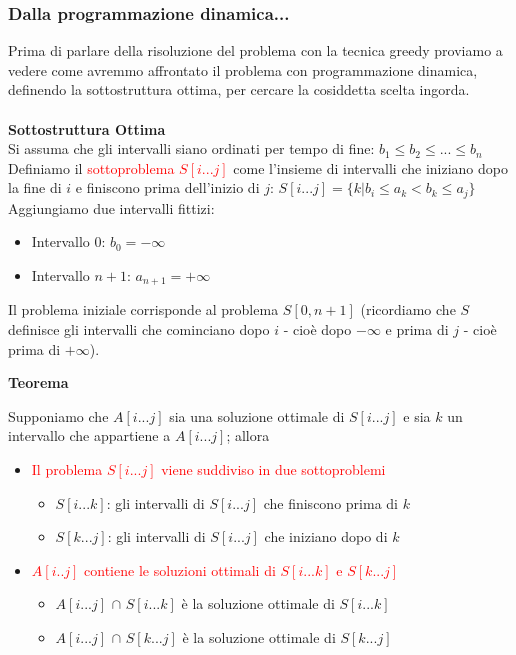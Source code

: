 \documentclass[../cheatSheetAlgoritmi.tex]{subfiles}
\begin{document}
\subsubsection{Dalla programmazione dinamica...}
Prima di parlare della risoluzione del problema con la tecnica greedy proviamo a vedere come avremmo affrontato il problema con programmazione dinamica, definendo la sottostruttura ottima, per cercare la cosiddetta scelta ingorda.\\\\
\textbf{Sottostruttura Ottima}\\
Si assuma che gli intervalli siano ordinati per tempo di fine: $b_1 \leq b_2 \leq ... \leq b_n$\\
Definiamo il \textcolor{red}{sottoproblema $S[i...j]$} come l'insieme di intervalli che iniziano dopo la fine di $i$ e finiscono prima dell'inizio di $j$: $S[i...j] = \{k|b_i \leq a_k < b_k \leq a_j\}$\\
Aggiungiamo due intervalli fittizi:\\
\begin{itemize}
	\item  Intervallo 0: $b_0 = - \infty$ 
	\item  Intervallo $n+1$: $a_{n+1} = + \infty$ 
\end{itemize}
Il problema iniziale corrisponde al problema $S[0,n+1]$ (ricordiamo che $S$ definisce gli intervalli che cominciano dopo $i$ - cioè dopo $- \infty$ e prima di $j$ - cioè prima di $+ \infty$).
\newpage
\begin{flushleft}
\textbf{Teorema}
\end{flushleft}
Supponiamo che $A[i...j]$ sia una soluzione ottimale di $S[i...j]$ e sia $k$ un intervallo che appartiene a $A[i...j]$; allora
\begin{itemize}
	\item  \textcolor{red}{Il problema $S[i...j]$ viene suddiviso in due sottoproblemi}
		\begin{itemize}
			\item  $S[i...k]$: gli intervalli di $S[i...j]$ che finiscono prima di $k$
			\item  $S[k...j]$: gli intervalli di $S[i...j]$ che iniziano dopo di $k$ 
		\end{itemize}
	\item  \textcolor{red}{$A[i..j]$ contiene le soluzioni ottimali di $S[i...k]$ e $S[k...j]$} 
		\begin{itemize}
			\item  $A[i...j]$ $\cap$ $S[i...k]$ è la soluzione ottimale di $S[i...k]$
			\item  $A[i...j]$ $\cap$ $S[k...j]$ è la soluzione ottimale di $S[k...j]$
		\end{itemize}
\end{itemize}
\end{document}
